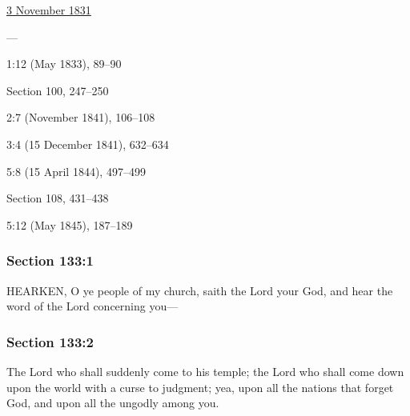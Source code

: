 		\begin{compactdesc}
			\item[JSP] \hyperref[EMS-1831-JS-3-NOV-1831]{3 November 1831}
			\item[BC] ---
			\item[EMS] 1:12 (May 1833), 89--90
			\item[DC 1835] Section 100, 247--250
			\item[MS] 2:7 (November 1841), 106--108
			\item[TS] 3:4 (15 December 1841), 632--634
			\item[TS] 5:8 (15 April 1844), 497--499
			\item[DC 1844] Section 108, 431--438
			\item[MS] 5:12 (May 1845), 187--189
		\end{compactdesc}

	\subsubsection{Section 133:1} %
		\label{DC133-1}

		HEARKEN, O ye people of my church, saith the Lord your God, and hear the word of the Lord concerning you---


	\subsubsection{Section 133:2} %
		\label{DC133-2}

		The Lord who shall suddenly come to his temple; the Lord who shall come down upon the world with a curse to judgment; yea, upon all the nations that forget God, and upon all the ungodly among you.



